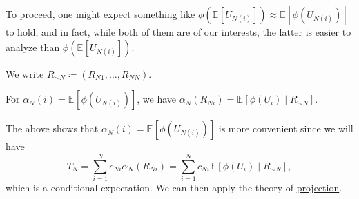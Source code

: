 To proceed, one might expect something like \(\phi (\mathbb{E}_{}[U_{N(i)}] ) \approx \mathbb{E}_{}[\phi (U_{N(i)})] \) to hold, and in fact, while both of them are of our interests, the latter is easier to analyze than \(\phi (\mathbb{E}_{}[U_{N(i)}] )\).

\begin{notation}
	We write \(R_{\sim N} \coloneqq (R_{N1}, \dots , R_{NN})\).
\end{notation}

\begin{intuition}
	For \(\alpha _N(i) = \mathbb{E}_{}[\phi (U_{N(i)})]\), we have \(\alpha _N(R_{Ni}) = \mathbb{E}_{}[\phi (U_i) \mid R_{\sim N}]\).
\end{intuition}

The above shows that \(\alpha _N(i) = \mathbb{E}_{}[\phi (U_{N(i)})]\) is more convenient since we will have
\[
	T_N
	= \sum_{i=1}^{N} c_{Ni} \alpha _N(R_{Ni})
	= \sum_{i=1}^{N} c_{Ni} \mathbb{E}_{}[\phi (U_i) \mid R_{\sim N}] ,
\]
which is a conditional expectation. We can then apply the theory of \hyperref[def:projection]{projection}.